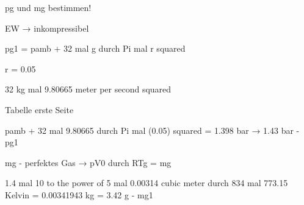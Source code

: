 pg und mg bestimmen!

EW → inkompressibel

pg1 = pamb + 32 mal g durch Pi mal r squared

r = 0.05

32 kg mal 9.80665 meter per second squared

Tabelle erste Seite

pamb + 32 mal 9.80665 durch Pi mal (0.05) squared = 1.398 bar → 1.43 bar - pg1

mg - perfektes Gas → pV0 durch RTg = mg

1.4 mal 10 to the power of 5 mal 0.00314 cubic meter durch 834 mal 773.15 Kelvin = 0.00341943 kg = 3.42 g - mg1